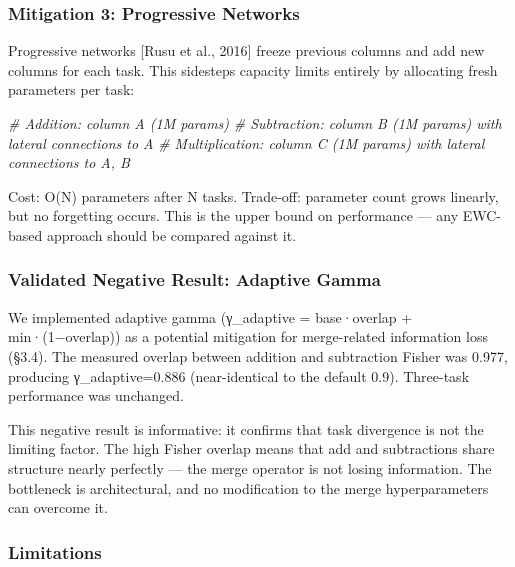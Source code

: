 \documentclass[
]{article}
\newenvironment{Shaded}{}{}
\newcommand{\CommentTok}[1]{\textcolor[rgb]{0.38,0.63,0.69}{\textit{#1}}}
\begin{document}
\subsubsection{Mitigation 3: Progressive
Networks}\label{mitigation-3-progressive-networks}

Progressive networks {[}Rusu et al., 2016{]} freeze previous columns and
add new columns for each task. This sidesteps capacity limits entirely
by allocating fresh parameters per task:

\begin{Shaded}
\begin{Highlighting}[]
\CommentTok{\# Addition: column A (1M params)}
\CommentTok{\# Subtraction: column B (1M params) with lateral connections to A}
\CommentTok{\# Multiplication: column C (1M params) with lateral connections to A, B}
\end{Highlighting}
\end{Shaded}

Cost: O(N) parameters after N tasks. Trade-off: parameter count grows
linearly, but no forgetting occurs. This is the upper bound on
performance --- any EWC-based approach should be compared against it.

\subsubsection{Validated Negative Result: Adaptive
Gamma}\label{validated-negative-result-adaptive-gamma}

We implemented adaptive gamma (γ\_adaptive = base·overlap +
min·(1−overlap)) as a potential mitigation for merge-related information
loss (§3.4). The measured overlap between addition and subtraction
Fisher was 0.977, producing γ\_adaptive=0.886 (near-identical to the
default 0.9). Three-task performance was unchanged.

This negative result is informative: it confirms that task divergence is
not the limiting factor. The high Fisher overlap means that add and
subtractions share structure nearly perfectly --- the merge operator is
not losing information. The bottleneck is architectural, and no
modification to the merge hyperparameters can overcome it.

\subsubsection{Limitations}\label{limitations}
\end{document}
